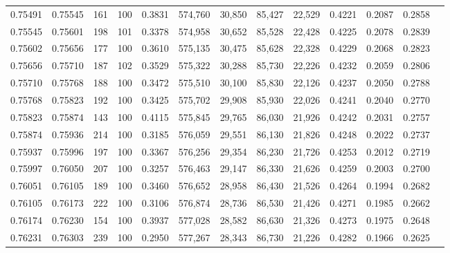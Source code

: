 \begin{tabular}{rrrrrrrrrrrrr}
0.75491 & 0.75545 &   161 & 100 &                                     0.3831 & 574,760 &  30,850 &  85,427 &  22,529 & 0.4221 & 0.2087 & 0.2858 \\
0.75545 & 0.75601 &   198 & 101 &                                     0.3378 & 574,958 &  30,652 &  85,528 &  22,428 & 0.4225 & 0.2078 & 0.2839 \\
0.75602 & 0.75656 &   177 & 100 &                                     0.3610 & 575,135 &  30,475 &  85,628 &  22,328 & 0.4229 & 0.2068 & 0.2823 \\
0.75656 & 0.75710 &   187 & 102 &                                     0.3529 & 575,322 &  30,288 &  85,730 &  22,226 & 0.4232 & 0.2059 & 0.2806 \\
0.75710 & 0.75768 &   188 & 100 &                                     0.3472 & 575,510 &  30,100 &  85,830 &  22,126 & 0.4237 & 0.2050 & 0.2788 \\
0.75768 & 0.75823 &   192 & 100 &                                     0.3425 & 575,702 &  29,908 &  85,930 &  22,026 & 0.4241 & 0.2040 & 0.2770 \\
0.75823 & 0.75874 &   143 & 100 &                                     0.4115 & 575,845 &  29,765 &  86,030 &  21,926 & 0.4242 & 0.2031 & 0.2757 \\
0.75874 & 0.75936 &   214 & 100 &                                     0.3185 & 576,059 &  29,551 &  86,130 &  21,826 & 0.4248 & 0.2022 & 0.2737 \\
0.75937 & 0.75996 &   197 & 100 &                                     0.3367 & 576,256 &  29,354 &  86,230 &  21,726 & 0.4253 & 0.2012 & 0.2719 \\
0.75997 & 0.76050 &   207 & 100 &                                     0.3257 & 576,463 &  29,147 &  86,330 &  21,626 & 0.4259 & 0.2003 & 0.2700 \\
0.76051 & 0.76105 &   189 & 100 &                                     0.3460 & 576,652 &  28,958 &  86,430 &  21,526 & 0.4264 & 0.1994 & 0.2682 \\
0.76105 & 0.76173 &   222 & 100 &                                     0.3106 & 576,874 &  28,736 &  86,530 &  21,426 & 0.4271 & 0.1985 & 0.2662 \\
0.76174 & 0.76230 &   154 & 100 &                                     0.3937 & 577,028 &  28,582 &  86,630 &  21,326 & 0.4273 & 0.1975 & 0.2648 \\
0.76231 & 0.76303 &   239 & 100 &                                     0.2950 & 577,267 &  28,343 &  86,730 &  21,226 & 0.4282 & 0.1966 & 0.2625 \\

\end{tabular}
